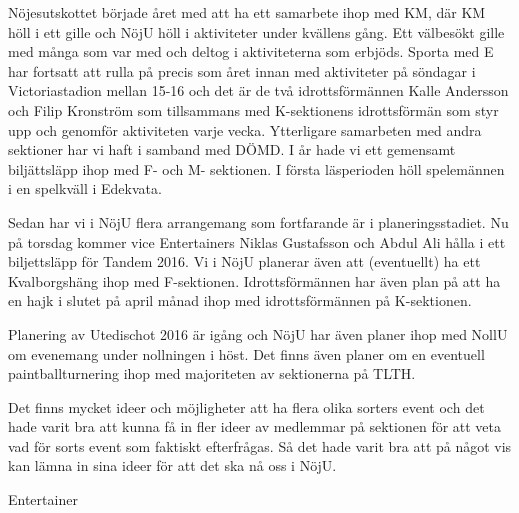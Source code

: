 \documentclass[../_main/handlingar.tex]{subfiles}
\begin{document}

Nöjesutskottet började året med att ha ett samarbete ihop med KM, där KM höll i ett gille och NöjU höll i aktiviteter under kvällens gång. Ett välbesökt gille med många som var med och deltog i aktiviteterna som erbjöds. Sporta med E har fortsatt att rulla på precis som året innan med aktiviteter på söndagar i Victoriastadion mellan 15-16 och det är de två idrottsförmännen Kalle Andersson och Filip Kronström som tillsammans med K-sektionens idrottsförmän som styr upp och genomför aktiviteten varje vecka. Ytterligare samarbeten med andra sektioner har vi haft i samband med DÖMD. I år hade vi ett gemensamt biljättsläpp ihop med F- och M- sektionen. I första läsperioden höll spelemännen i en spelkväll i Edekvata.

Sedan har vi i NöjU flera arrangemang som fortfarande är i planeringsstadiet. Nu på torsdag kommer vice Entertainers Niklas Gustafsson och Abdul Ali hålla i ett biljettsläpp för Tandem 2016. Vi i NöjU planerar även att (eventuellt) ha ett Kvalborgshäng ihop med F-sektionen. Idrottsförmännen har även plan på att ha en hajk i slutet på april månad ihop med idrottsförmännen på K-sektionen.

Planering av Utedischot 2016 är igång och NöjU har även planer ihop med NollU om evenemang under nollningen i höst. Det finns även planer om en eventuell paintballturnering ihop med majoriteten av sektionerna på TLTH.

Det finns mycket ideer och möjligheter att ha flera olika sorters event och det hade varit bra att kunna få in fler ideer av medlemmar på sektionen för att veta vad för sorts event som faktiskt efterfrågas. Så det hade varit bra att på något vis kan lämna in sina ideer för att det ska nå oss i NöjU.

\begin{signatures}{1}
    \mvh
    \signature{Dalia Khairallah}{Entertainer}
\end{signatures}
\end{document}
